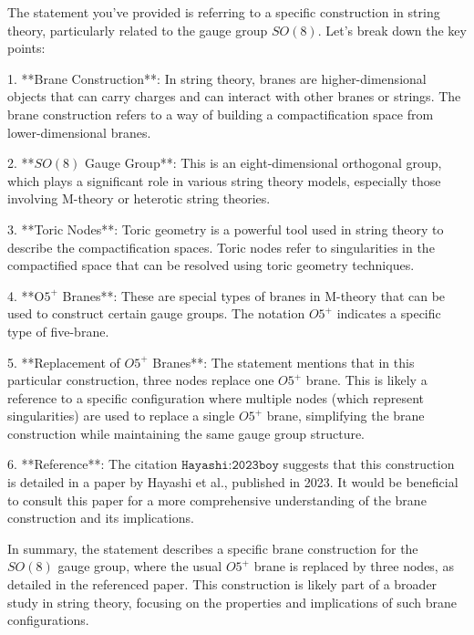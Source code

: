 The statement you've provided is referring to a specific construction in string theory, particularly related to the gauge group \( SO(8) \). Let's break down the key points:

1. **Brane Construction**: In string theory, branes are higher-dimensional objects that can carry charges and can interact with other branes or strings. The brane construction refers to a way of building a compactification space from lower-dimensional branes.

2. **\( SO(8) \) Gauge Group**: This is an eight-dimensional orthogonal group, which plays a significant role in various string theory models, especially those involving M-theory or heterotic string theories.

3. **Toric Nodes**: Toric geometry is a powerful tool used in string theory to describe the compactification spaces. Toric nodes refer to singularities in the compactified space that can be resolved using toric geometry techniques.

4. **O\( 5^+ \) Branes**: These are special types of branes in M-theory that can be used to construct certain gauge groups. The notation \( O5^+ \) indicates a specific type of five-brane.

5. **Replacement of \( O5^+ \) Branes**: The statement mentions that in this particular construction, three nodes replace one \( O5^+ \) brane. This is likely a reference to a specific configuration where multiple nodes (which represent singularities) are used to replace a single \( O5^+ \) brane, simplifying the brane construction while maintaining the same gauge group structure.

6. **Reference**: The citation \(\texttt{Hayashi:2023boy}\) suggests that this construction is detailed in a paper by Hayashi et al., published in 2023. It would be beneficial to consult this paper for a more comprehensive understanding of the brane construction and its implications.

In summary, the statement describes a specific brane construction for the \( SO(8) \) gauge group, where the usual \( O5^+ \) brane is replaced by three nodes, as detailed in the referenced paper. This construction is likely part of a broader study in string theory, focusing on the properties and implications of such brane configurations.